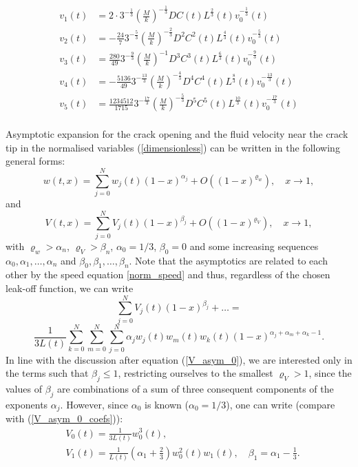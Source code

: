 \begin{align}
v_1(t)&=2\cdot3^{-\frac{1}{3}}\left(\frac{M}{k}\right)^{-\frac{1}{3}}DC(t)L^{\frac{2}{3}}(t)v_0^{-\frac{1}{3}}(t)\\
v_2(t)&=-\frac{24}{7}3^{-\frac{5}{3}}\left(\frac{M}{k}\right)^{-\frac{2}{3}}D^2C^2(t)L^{\frac{4}{3}}(t)v_0^{-\frac{5}{3}}(t)\\
v_3(t)&=\frac{280}{49}3^{-\frac{9}{3}}\left(\frac{M}{k}\right)^{-1}D^3C^3(t)L^{\frac{6}{3}}(t)v_0^{-\frac{9}{3}}(t)\\
v_4(t)&=-\frac{5136}{49}3^{-\frac{13}{3}}\left(\frac{M}{k}\right)^{-\frac{4}{3}}D^4C^4(t)L^{\frac{8}{3}}(t)v_0^{-\frac{13}{3}}(t)\\
v_5(t)&=\frac{1234512}{1715}3^{-\frac{17}{3}}\left(\frac{M}{k}\right)^{-\frac{5}{3}}D^5C^5(t)L^{\frac{10}{3}}(t)v_0^{-\frac{17}{3}}(t)\\
\end{align}



Asymptotic expansion for the crack opening and the fluid velocity near the crack tip in the normalised variables (\ref{dimensionless}) can be written in the following general forms:
\begin{equation}\label{w_asym}
w(t, x)=\sum_{j=0}^Nw_j(t)(1-x)^{\alpha_j}+O((1- x)^{\varrho_w}), \quad x\rightarrow 1,
\end{equation}
and
\begin{equation}\label{v_asym}
V(t, x)=\sum_{j=0}^NV_j(t)(1-x)^{\beta_j}+O((1- x)^{\varrho_V}),\quad  x\rightarrow 1,
\end{equation}
with $\varrho_w>\alpha_n$, $\varrho_V>\beta_n$, $\alpha_0=1/3$, $\beta_0=0$ and some increasing sequences $\alpha_0,\alpha_1,\ldots,\alpha_n$ and $\beta_0,\beta_1,\ldots,\beta_n$. Note that the asymptotics are related to each other by the speed equation \eqref{norm_speed} and thus, regardless of the chosen leak-off function, we can write
\begin{equation}\label{v_asym_1}
\sum_{j=0}^NV_j(t)(1-x)^{\beta_j}+\ldots=
\end{equation}
\[
\frac{1}{3L(t)}\sum_{k=0}^N\sum_{m=0}^N\sum_{j=0}^N\alpha_jw_j(t)
w_m(t)w_k(t)(1-x)^{\alpha_j+\alpha_m+\alpha_k-1}.
\]
In line with the discussion after equation (\ref{V_asym_0}),
we are interested only in the terms such that $\beta_j\le1$, restricting ourselves to the smallest $\varrho_V>1$,
since the values of $\beta_j$ are combinations of a sum of three consequent components of the exponents $\alpha_j$.
However, since $\alpha_0$ is known ($\alpha_0=1/3$), one can write (compare with (\ref{V_asym_0_coefs})):
\begin{align}
& V_{0}(t)=\frac{1}{3L(t)}w_{0}^{3}(t)\label{v_0}, \\
& V_{1}(t)=\frac{1}{L(t)}\left(\alpha_1+\frac{2}{3}\right) w_{0}^{2}(t) w_{1}(t),\quad \beta_1=\alpha_1-\frac{1}{3}.\label{v_1}
\end{align}

